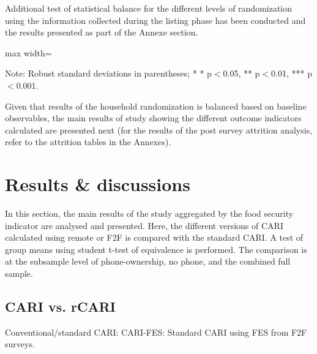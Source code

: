 \documentclass[11pt,harvard]{article}
\begin{document}
	Additional test of statistical balance for the different levels of randomization using the information collected during the listing phase has been conducted and the results presented as part of the Annexe section.
	
	\begin{table}[htbp]
		\centering
		\begin{adjustbox}{max width=\textwidth}
			\begin{threeparttable}
				\caption{Balance Table by Randomized Survey Modality: Face-to-Face vs. Remote for Completed Surveys}
				\scriptsize
				 
				\label{tab:BF_Completed_Demo_Balance_Modality}
				\begin{tablenotes}
					\item Note: Robust standard deviations in parentheses; * * p$<$0.05, ** p$<$0.01, *** p$<$0.001. 
				\end{tablenotes}
			\end{threeparttable}
		\end{adjustbox}
	\end{table}
	
	Given that results of the household randomization is balanced based on baseline observables, the main results of study showing the different outcome indicators calculated are presented next (for the results of the post survey attrition analysis, refer to the attrition tables in the Annexes). 
	
	\pagebreak
	
	\section{Results \& discussions}
	
	In this section, the main results of the study aggregated by the food security indicator are analysed and presented. Here, the different versions of CARI calculated using remote or F2F is compared with the standard CARI. A test of group means using student t-test of equivalence is performed. The comparison is at the subsample level of phone-ownership, no phone, and the combined full sample. 
	
	\subsection{CARI vs. rCARI}
	
	Conventional/standard CARI:  CARI-FES: Standard CARI using FES from F2F surveys.
	
\end{document}
